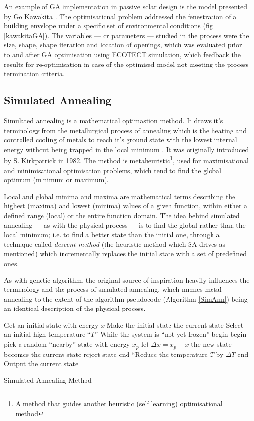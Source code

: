 An example of GA implementation in passive solar design is the model presented by Go Kawakita \cite{kawakita08}. The optimisational problem addressed the fenestration of a building envelope under a specific set of environmental conditions (fig \ref{kawakitaGA}). The variables --- or parameters --- studied in the process were the size, shape, shape iteration and location of openings, which was evaluated prior to and after GA optimisation using ECOTECT simulation, which feedback the results for re-optimisation in case of the optimised model not meeting the process termination criteria.

\clearpage
\subsection{Simulated Annealing}

Simulated annealing is a mathematical optimastion method. It draws it's terminology from the metallurgical process of annealing which is the heating and controlled cooling of metals to reach it's ground state with the lowest internal energy without being trapped in the local minimum \cite{lam88}. It was originally introduced by S. Kirkpatrick in 1982. The method is metaheuristic\footnote{A method that guides another heuristic (self learning) optimisational method}, used for maximisational and minimisational optimisation problems, which tend to find the global optimum (minimum or maximum).

Local and global minima and maxima are mathematical terms describing the highest (maxima) and lowest (minima) values of a given function, within either a defined range (local) or the entire function domain. The idea behind simulated annealing --- as with the physical process --- is to find the global rather than the local minimum; i.e. to find a better state than the initial one, through a technique called \emph{descent method} (the heuristic method which SA drives as mentioned)  which incrementally replaces the initial state with a set of predefined ones.

As with genetic algorithm, the original source of inspiration heavily influences the terminology and the process of simulated annealing, which mimics metal annealing to the extent of the algorithm pseudocode (Algorithm \ref{SimAnn}) being an identical description of the physical process.

\begin{algorithm}
\begin{algorithmic}[1]
\State Get an initial state with energy $x$
\State Make the initial state the current state
\State Select an initial high temperature ``$T$''
\State While the system is ``not yet frozen''
	\State begin
		\State begin
		\State pick a random ``nearby'' state with energy $x_p$
		\State let $\Delta x = x_p - x$
			\State the new state becomes the current state
		\Else
			\State reject state
		\EndIf
		\State end
	\EndWhile
	\State ``Reduce the temperature $T$ by $\Delta T$
	\State end
\State Output the current state
\end{algorithmic}
\caption{Simulated Annealing Method \cite{lam88}}
\label{SimAnn}
\end{algorithm}

